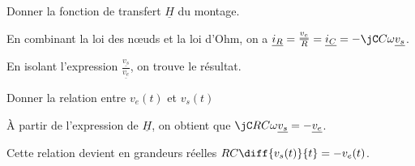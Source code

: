 


\begin{enonce}
  Donner la fonction de transfert \(\underline{H}\) du montage.
\end{enonce}


\begin{corrige}
  En combinant la loi des nœuds et la loi d’Ohm, on a \(\underline{i_{R}} = \frac{\underline{v_{e}}}{R} = \underline{i_{C}} = -\jC C\omega\underline{v_{s}}\). 
  
  En isolant l'expression \(\frac{\underline{v_{s}}}{\underline{v_{e}}}\), on trouve le résultat.
\end{corrige}




\begin{enonce}
 Donner la relation entre $v_e(t)$ et $v_s(t)$
\end{enonce}


\begin{corrige}
\`A partir de l'expression de \(\underline{H}\), on obtient que \(\jC RC\omega\underline{v_s}=-\underline{v_e}\). 

Cette relation devient en grandeurs réelles \(RC\diff{v_s(t)}{t}=-v_e(t)\).
\end{corrige}



\finEntrainement



\newpage



